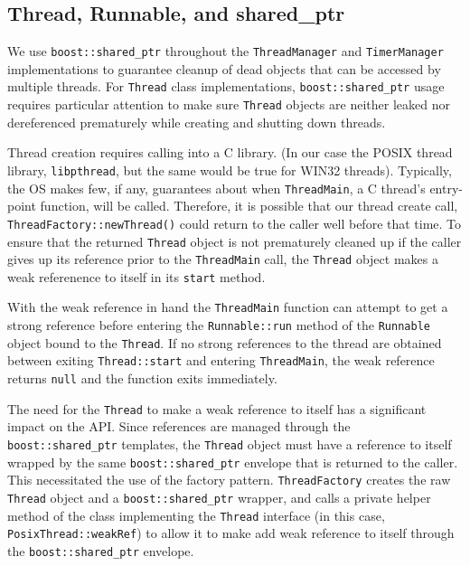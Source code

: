 \documentclass[nocopyrightspace,blockstyle]{sigplanconf}
\begin{document}
\subsection{Thread, Runnable, and shared\_ptr}
We use \texttt{boost::shared\_ptr} throughout the \texttt{ThreadManager} and
\texttt{TimerManager} implementations to guarantee cleanup of dead objects that can
be accessed by multiple threads. For \texttt{Thread} class implementations,
\texttt{boost::shared\_ptr} usage requires particular attention to make sure
\texttt{Thread} objects are neither leaked nor dereferenced prematurely while
creating and shutting down threads.

Thread creation requires calling into a C library. (In our case the POSIX
thread library, \texttt{libpthread}, but the same would be true for WIN32 threads).
Typically, the OS makes few, if any, guarantees about when \texttt{ThreadMain}, a C thread's entry-point function, will be called. Therefore, it is
possible that our thread create call,
\texttt{ThreadFactory::newThread()} could return to the caller
well before that time. To ensure that the returned \texttt{Thread} object is not
prematurely cleaned up if the caller gives up its reference prior to the
\texttt{ThreadMain} call, the \texttt{Thread} object makes a weak referenence to
itself in its \texttt{start} method.

With the weak reference in hand the \texttt{ThreadMain} function can attempt to get
a strong reference before entering the \texttt{Runnable::run} method of the
\texttt{Runnable} object bound to the \texttt{Thread}. If no strong references to the
thread are obtained between exiting \texttt{Thread::start} and entering \texttt{ThreadMain}, the weak reference returns \texttt{null} and the function 
exits immediately.

The need for the \texttt{Thread} to make a weak reference to itself has a
significant impact on the API. Since references are managed through the
\texttt{boost::shared\_ptr} templates, the \texttt{Thread} object must have a reference
to itself wrapped by the same \texttt{boost::shared\_ptr} envelope that is returned
to the caller. This necessitated the use of the factory pattern.
\texttt{ThreadFactory} creates the raw \texttt{Thread} object and a
\texttt{boost::shared\_ptr} wrapper, and calls a private helper method of the class
implementing the \texttt{Thread} interface (in this case, \texttt{PosixThread::weakRef})
 to allow it to make add weak reference to itself through the
 \texttt{boost::shared\_ptr} envelope.
\end{document}
